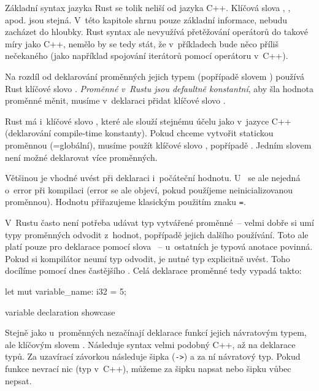 \documentclass[main.tex]{subfiles}
\begin{document}

Základní syntax jazyka Rust se tolik neliší od jazyka C++. Klíčová slova ,
,  apod. jsou stejná. V~této kapitole shrnu pouze základní
informace, nebudu zacházet do hloubky. Rust syntax ale nevyužívá přetěžování operátorů
do takové míry jako C++, nemělo by se tedy stát, že v~příkladech bude něco příliš
nečekaného (jako například spojování iterátorů pomocí operátoru \icpp{|} v~C++).


Na rozdíl od deklarování proměnných jejich typem (popřípadě slovem ) používá
Rust klíčové slovo . \emph{Proměnné v~Rustu jsou defaultně konstantní}, aby
šla hodnota proměnné měnit, musíme v~deklaraci přidat klíčové slovo .

Rust má i~klíčové slovo , které ale slouží stejnému účelu jako
 v~jazyce C++ (deklarování compile-time konstanty).
Pokud chceme vytvořit statickou proměnnou (=globální), musíme použít klíčové slovo
, popřípadě . Jedním slovem není možné deklarovat více
proměnných.

Většinou je vhodné uvést při deklaraci i~počáteční hodnotu. U~ se ale
nejedná o~error při kompilaci (error se ale objeví, pokud použíjeme neinicializovanou
proměnnou). Hodnotu přiřazujeme klasickým použitím znaku \texttt{=}.

V~Rustu často není potřeba udávat typ vytvářené proměnné~-- velmi dobře si umí typy
proměnných odvodit z~hodnot, popřípadě jejich dalšího používání. Toto ale platí pouze
pro deklarace pomocí slova ~-- u~ostatních je typová anotace povinná. Pokud
si kompilátor neumí typ odvodit, je nutné typ explicitně uvést. Toho docílíme pomocí
dnes častějšího . Celá deklarace proměnné tedy vypadá takto:

\obrazek
\begin{rustcode}
    let mut variable_name: i32 = 5;
\end{rustcode}
{variable declaration showcase}


Stejně jako u~proměnných nezačínají deklarace funkcí jejich návratovým typem, ale
klíčovým slovem . Následuje syntax velmi podobný C++, až na  deklarace typů. Za uzavírací závorkou následuje šipka (\texttt{->}) a za ní
návratový typ. Pokud funkce nevrací nic (typ  v~C++), můžeme za šipku napsat
 \irust{()} nebo šipku vůbec nepsat.
\end{document}
